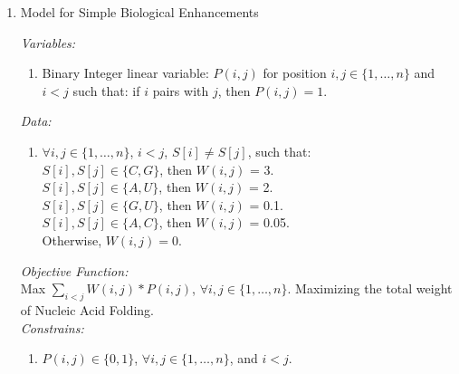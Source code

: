 \documentclass[11pt]{article}
\begin{document}
{\begin{enumerate}
\begin{enumerate}
    \textbf{Complemtary Pairs Constrains:}
    \item $P(i,j)\leq 2-(u_i+u_j+g_i+g_j)$, $\forall i,j\in \{1,\dots, n\}$ and $i<j$.

    \item $P(i,j)\leq 2-(u_i+u_j+c_i+c_j)$, $\forall i,j\in \{1,\dots, n\}$ and $i<j$.

    \item $P(i,j)\leq 2-(a_i+a_j+c_i+c_j)$, $\forall i,j\in \{1,\dots, n\}$ and $i<j$.

    \item $P(i,j)\leq 2-(a_i+a_j+g_i+g_j)$, $\forall i,j\in \{1,\dots, n\}$ and $i<j$.
\end{enumerate}

\item Model for Simple Biological Enhancements
\newline

\textit{Variables:}
\begin{enumerate}
    \item Binary Integer linear variable: $P(i,j)$ for position $i,j\in \{1,\dots, n\}$ and $i < j$ such that:
    if $i$ pairs with $j$, then $P(i,j)=1$.
\end{enumerate}



\textit{Data:}
\begin{enumerate}
    \item $\forall i,j \in \{1,\dots, n\}$, $i<j$, $S[i]\neq S[j]$, such that:\\
    $S[i],S[j] \in \{C,G\}$, then $W(i,j)$ = 3.\\
    $S[i],S[j] \in \{A,U\}$, then $W(i,j)$ = 2.\\
    $S[i],S[j] \in \{G,U\}$, then $W(i,j)$ = 0.1.\\
    $S[i],S[j] \in \{A,C\}$, then $W(i,j)$ = 0.05.\\
    Otherwise, $W(i,j) = 0$.\\
\end{enumerate}

\textit{Objective Function:}\\
Max $\sum_{i<j}W(i,j)*P(i,j)$, $\forall i,j\in \{1,\dots, n\}$. Maximizing the total weight of Nucleic Acid Folding.\\

\textit{Constrains:}
\begin{enumerate}
    \item $P(i,j)\in \{0,1\}$, $\forall i,j \in \{1,\dots, n\}$, and $i<j$.
    

\end{enumerate}
\end{enumerate}}
\end{document}
